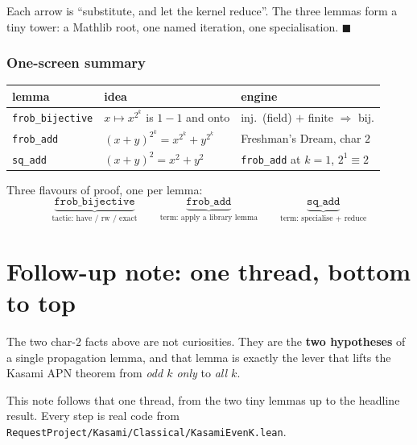 \documentclass[11pt]{article}
\begin{document}
\medskip
\noindent
Each arrow is ``substitute, and let the kernel reduce''. The three lemmas
form a tiny tower: a Mathlib root, one named iteration, one specialisation.
\hfill$\blacksquare$

\bigskip\bigskip

\section*{One-screen summary}

\begin{center}
\renewcommand{\arraystretch}{1.6}
\begin{tabular}{l l l}
\textbf{lemma} & \textbf{idea} & \textbf{engine} \\
\hline
\texttt{frob\_bijective} &
$x\mapsto x^{2^k}$ is $1\!\!-\!\!1$ and onto &
inj.\ (field) $+$ finite $\Rightarrow$ bij. \\
\texttt{frob\_add} &
$(x+y)^{2^k}=x^{2^k}+y^{2^k}$ &
Freshman's Dream, char $2$ \\
\texttt{sq\_add} &
$(x+y)^2=x^2+y^2$ &
\texttt{frob\_add} at $k=1$,\;\; $2^1\equiv 2$ \\
\end{tabular}
\end{center}

\bigskip
\noindent
Three flavours of proof, one per lemma:
\[
\underbrace{\texttt{frob\_bijective}}_{\text{tactic: have / rw / exact}}
\qquad
\underbrace{\texttt{frob\_add}}_{\text{term: apply a library lemma}}
\qquad
\underbrace{\texttt{sq\_add}}_{\text{term: specialise + reduce}}
\]

\bigskip\bigskip

\part*{Follow-up note: one thread, bottom to top}

\bigskip
\noindent
The two char-$2$ facts above are not curiosities. They are the
\textbf{two hypotheses} of a single propagation lemma, and that lemma is
exactly the lever that lifts the Kasami APN theorem from \emph{odd $k$
only} to \emph{all $k$}.

This note follows that one thread, from the two tiny lemmas up to the
headline result. Every step is real code from
\texttt{RequestProject/Kasami/Classical/KasamiEvenK.lean}.
\end{document}
